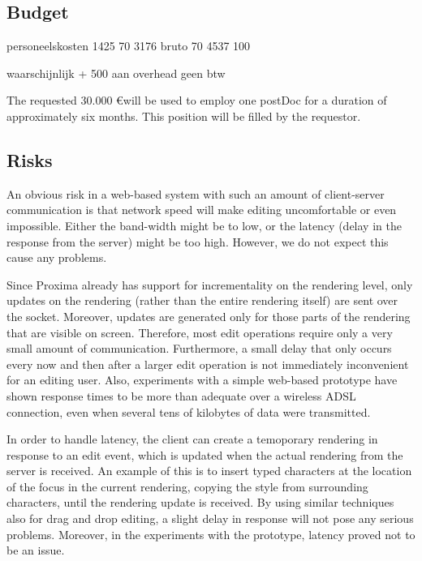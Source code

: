 \documentclass[10pt]{article}
\begin{document}
\subsection{Budget}

\bc
personeelskosten
1425       70%
3176 bruto 70%
4537       100%

waarschijnlijk + 500 aan overhead
geen btw
\ec

The requested 30.000 \euro will be used to employ one postDoc for a duration of approximately six months. This position will be filled by the requestor.

\subsection{Risks}


An obvious risk in a web-based system with such an amount of client-server communication is that network speed will make editing uncomfortable or even impossible. Either the band-width might be to low, or the latency (delay in the response from the server) might be too high. However, we do not expect this cause any problems.

Since Proxima already has support for incrementality on the rendering level, only updates on the rendering (rather than the entire rendering itself) are sent over the socket. Moreover, updates are generated only for those parts of the rendering that are visible on screen. Therefore, most edit operations require only a very small amount of communication. Furthermore, a small delay that only occurs every now and then after a larger edit operation is not immediately inconvenient for an editing user. Also, experiments with a simple web-based prototype have shown response times to be more than adequate over a wireless ADSL connection, even when several tens of kilobytes of data were transmitted. 

In order to handle latency, the client can create a temoporary rendering in response to an edit event, which is updated when the actual rendering from the server is received. An example of this is to insert typed characters at the location of the focus in the current rendering, copying the style from surrounding characters, until the rendering update is received. By using similar techniques also for drag and drop editing, a slight delay in response will not pose any serious problems. Moreover, in the experiments with the prototype, latency proved not to be an issue.
\end{document}
